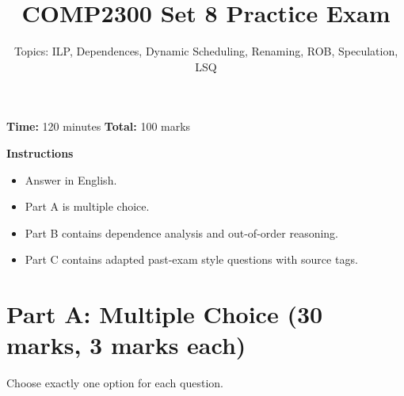 \documentclass[11pt]{article}
\title{COMP2300 Set 8 Practice Exam}
\author{Topics: ILP, Dependences, Dynamic Scheduling, Renaming, ROB, Speculation, LSQ}
\date{}
\begin{document}
\maketitle

\noindent\textbf{Time:} 120 minutes \hfill
\textbf{Total:} 100 marks

\vspace{0.5em}
\noindent\textbf{Instructions}
\begin{itemize}[leftmargin=1.5em]
  \item Answer in English.
  \item Part A is multiple choice.
  \item Part B contains dependence analysis and out-of-order reasoning.
  \item Part C contains adapted past-exam style questions with source tags.
\end{itemize}

\section*{Part A: Multiple Choice (30 marks, 3 marks each)}
Choose exactly one option for each question.
\end{document}
